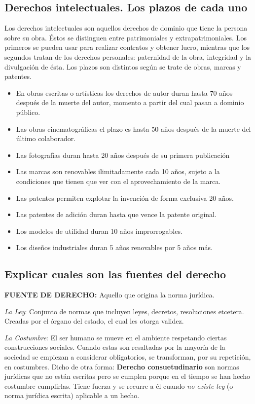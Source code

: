 \documentclass{article}
\begin{document}
\subsection{Derechos intelectuales. Los plazos de cada uno}
\label{sec:DerechosAutoryPlazos}
Los derechos intelectuales son aquellos derechos de dominio que tiene la persona sobre su obra. Éstos se distinguen entre patrimoniales y extrapatrimoniales. Los primeros se pueden usar para realizar contratos y obtener lucro, mientras que los segundos tratan de los derechos personales: paternidad de la obra, integridad y la divulgación de ésta. 
Los plazos son distintos según se trate de obras, marcas y patentes. 

\begin{itemize}
\item En  obras escritas o artísticas los derechos de autor duran hasta 70 años después de la muerte del autor, momento a partir del cual pasan a dominio público.
\item  Las obras cinematográficas el plazo es hasta 50 años después de la muerte del último colaborador. 
\item Las fotografías duran hasta 20 años después de su primera publicación
\item Las marcas son renovables ilimitadamente cada 10 años, sujeto a la condiciones que tienen que ver con el aprovechamiento de la marca.
\item Las patentes permiten explotar la invención de forma exclusiva 20 años. 
\item Las patentes de adición duran hasta que vence la patente original.
\item Los modelos de utilidad duran 10 años improrrogables.
\item Los diseños industriales duran 5 años renovables por 5 años más.
\end{itemize}

\subsection{Explicar cuales son las fuentes del derecho}
\label{sec:FuentesDeDerechoExplicadas}
\textbf{FUENTE DE DERECHO:} Aquello que origina la norma jurídica.

\textit{La Ley}: Conjunto de normas que incluyen leyes, decretos, resoluciones etcetera. Creadas por el órgano del estado, el cual les otorga validez.

\textit{La Costumbre}: El ser humano se mueve en el ambiente respetando ciertas construcciones sociales. Cuando estas son resaltadas por la mayoría de la sociedad se empiezan a considerar obligatorios, se transforman, por su repetición, en costumbres. Dicho de otra forma:  \textbf{Derecho consuetudinario} son normas jurídicas que no están escritas pero se cumplen porque en el tiempo se han hecho costumbre cumplirlas. Tiene fuerza y se recurre a él cuando \textit{no existe ley} (o norma jurídica escrita) aplicable a un hecho.
\end{document}
